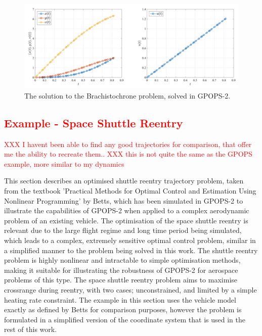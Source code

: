 \begin{figure}[ht]
	\centering
	\includegraphics[width=0.9\linewidth]{figures/4_LODESTAR/Brachistochrone}
	\caption{The solution to the Brachistochrone problem, solved in GPOPS-2\cite{Rao2010}.}
	\label{fig:Brachistochrone}
\end{figure}




\textcolor{red}{\section{Example - Space Shuttle Reentry}}
\textcolor{red}{XXX I havent been able to find any good trajectories for comparison, that offer me the ability to recreate them..}
\textcolor{red}{XXX this is not quite the same as the GPOPS example, more similar to my dynamics}

This section describes an optimised shuttle reentry trajectory problem, taken from the textbook 'Practical Methods for Optimal Control and Estimation Using Nonlinear Programming' by Betts\cite{Betts2009}, which has been simulated in GPOPS-2 to illustrate the capabilities of GPOPS-2 when applied to a complex aerodynamic problem of an existing vehicle. The optimisation of the space shuttle reentry is relevant due to the large flight regime and long time period being simulated, which leads to a complex, extremely sensitive optimal control problem\cite{Betts2009}, similar in a simplified manner to the problem being solved in this work. The shuttle reentry problem is highly nonlinear and intractable to simple optimisation methods\cite{Betts2009}, making it suitable for illustrating the robustness of GPOPS-2 for aerospace problems of this type. 
The space shuttle reentry problem aims to maximise crossrange during reentry, with two cases; unconstrained, and limited by a simple heating rate constraint. The example in this section uses the vehicle model exactly as defined by Betts\cite{Betts2009} for comparison purposes, however the problem is formulated in a simplified version of the coordinate system that is used in the rest of this work. 


